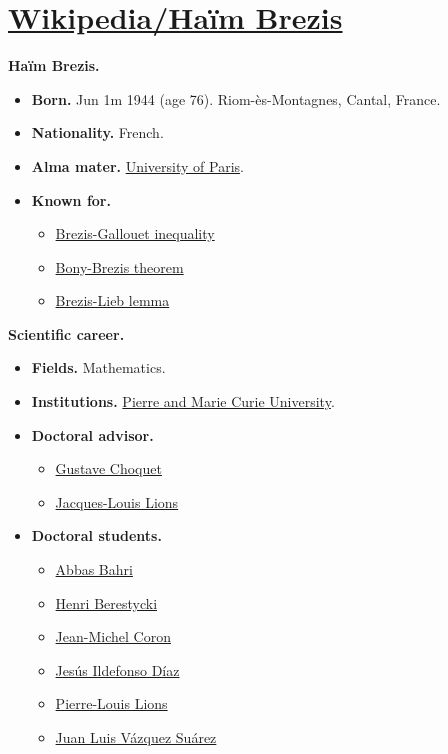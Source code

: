 \documentclass{book}
\numberwithin{equation}{section}
\begin{document}

\chapter{\href{https://en.wikipedia.org/wiki/Haim_Brezis}{Wikipedia/Ha\"im Brezis}}

\textbf{Haïm Brezis.}
\begin{itemize}
    \item \textbf{Born.} Jun 1m 1944 (age 76). Riom-ès-Montagnes, Cantal, France.
    \item \textbf{Nationality.} French.
    \item \textbf{Alma mater.} \href{https://en.wikipedia.org/wiki/University_of_Paris}{University of Paris}.
    \item \textbf{Known for.}
    \begin{itemize}
        \item \href{https://en.wikipedia.org/wiki/Brezis-Gallouet_inequality}{Brezis-Gallouet inequality}
        \item \href{https://en.wikipedia.org/wiki/Bony-Brezis_theorem}{Bony-Brezis theorem}
        \item \href{https://en.wikipedia.org/wiki/Brezis-Lieb_lemma}{Brezis-Lieb lemma}
    \end{itemize}
\end{itemize}
\textbf{Scientific career.}
\begin{itemize}
    \item \textbf{Fields.} Mathematics.
    \item \textbf{Institutions.} \href{https://en.wikipedia.org/wiki/Pierre_and_Marie_Curie_University}{Pierre and Marie Curie University}.
    \item \textbf{Doctoral advisor.}
    \begin{itemize}
        \item \href{https://en.wikipedia.org/wiki/Gustave_Choquet}{Gustave Choquet}
        \item \href{https://en.wikipedia.org/wiki/Jacques-Louis_Lions}{Jacques-Louis Lions}
    \end{itemize}
    \item \textbf{Doctoral students.}
    \begin{itemize}
        \item \href{https://en.wikipedia.org/wiki/Abbas_Bahri}{Abbas Bahri}
        \item \href{https://en.wikipedia.org/wiki/Jean-Michel_Coron}{Henri Berestycki}
        \item \href{https://en.wikipedia.org/wiki/Jean-Michel_Coron}{Jean-Michel Coron}
        \item \href{https://en.wikipedia.org/wiki/Jes%C3%BAs_Ildefonso_D%C3%ADaz}{Jes\'us Ildefonso D\'iaz}
        \item \href{https://en.wikipedia.org/wiki/Pierre-Louis_Lions}{Pierre-Louis Lions}
        \item \href{https://en.wikipedia.org/wiki/Juan_Luis_V%C3%A1zquez_Su%C3%A1rez}{Juan Luis V\'azquez Su\'arez}
    \end{itemize}
\end{itemize}
\end{document}
